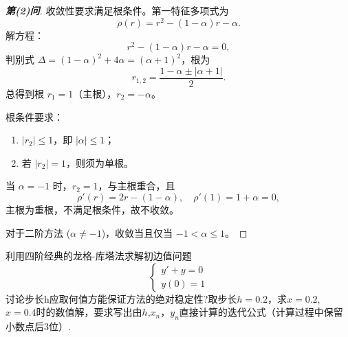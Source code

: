 \documentclass[lang=cn,newtx,12pt,scheme=chinese]{elegantbook}
\begin{document}
\begin{proof}[\textbf{第(2)问}]
	收敛性要求满足根条件。第一特征多项式为
	\[
	\rho(r) = r^2 - (1-\alpha) r - \alpha.
	\]
	解方程：
	\[
	r^2 - (1-\alpha) r - \alpha = 0,
	\]
	判别式 $\Delta = (1-\alpha)^2 + 4\alpha = (\alpha+1)^2$，根为
	\[
	r_{1,2} = \frac{1-\alpha \pm |\alpha+1|}{2}.
	\]
	总得到根 $r_1 = 1$（主根），$r_2 = -\alpha$。
	
	根条件要求：
	\begin{enumerate}
		\item $|r_2| \le 1$，即 $|\alpha| \le 1$；
		\item 若 $|r_2| = 1$，则须为单根。
	\end{enumerate}
	
	当 $\alpha = -1$ 时，$r_2 = 1$，与主根重合，且
	\[
	\rho'(r) = 2r - (1-\alpha),\quad \rho'(1) = 1+\alpha = 0,
	\]
	主根为重根，不满足根条件，故不收敛。
	
	对于二阶方法 ($\alpha \neq -1$)，收敛当且仅当 $-1 < \alpha \le 1$。
\end{proof}
\begin{exercise}
	利用四阶经典的龙格-库塔法求解初边值问题\[ 
	\begin{cases}
		y'+y=0\\
		y(0)=1
	\end{cases}
	\]
	讨论步长h应取何值方能保证方法的绝对稳定性?取步长$h=0.2$，求$x=0.2$, $x=0.4$时的数值解，要求写出由$h$,$x_n$，$y_n$直接计算的迭代公式（计算过程中保留小数点后3位）.
\end{exercise}
\end{document}
